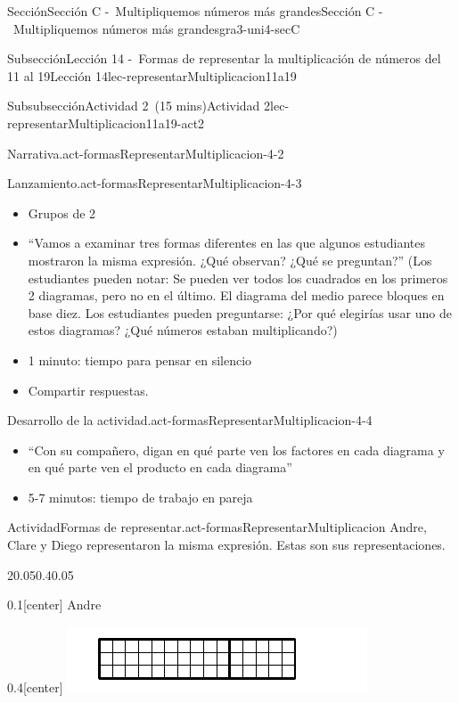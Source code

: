 \documentclass[oneside,10pt,]{article}
\begin{document}
\begin{sectionptx}{Sección}{Sección C -~Multipliquemos números más grandes}{}{Sección C -~Multipliquemos números más grandes}{}{}{gra3-uni4-secC}
\begin{subsectionptx}{Subsección}{Lección 14 -~Formas de representar la multiplicación de números del 11 al 19}{}{Lección 14}{}{}{lec-representarMultiplicacion11a19}
\begin{subsubsectionptx}{Subsubsección}{Actividad 2~(15 mins)}{}{Actividad 2}{}{}{lec-representarMultiplicacion11a19-act2}
\begin{paragraphs}{Narrativa.}{act-formasRepresentarMultiplicacion-4-2}
\end{paragraphs}%
\begin{paragraphs}{Lanzamiento.}{act-formasRepresentarMultiplicacion-4-3}%
%
\begin{itemize}[label=\textbullet]
\item{}Grupos de 2%
\item{}``Vamos a examinar tres formas diferentes en las que algunos estudiantes mostraron la misma expresión. ¿Qué observan? ¿Qué se preguntan?'' (Los estudiantes pueden notar: Se pueden ver todos los cuadrados en los primeros 2 diagramas, pero no en el último. El diagrama del medio parece bloques en base diez. Los estudiantes pueden preguntarse: ¿Por qué elegirías usar uno de estos diagramas? ¿Qué números estaban multiplicando?)%
\item{}1 minuto: tiempo para pensar en silencio%
\item{}Compartir respuestas.%
\end{itemize}
\end{paragraphs}%
\begin{paragraphs}{Desarrollo de la actividad.}{act-formasRepresentarMultiplicacion-4-4}%
%
\begin{itemize}[label=\textbullet]
\item{}``Con su compañero, digan en qué parte ven los factores en cada diagrama y en qué parte ven el producto en cada diagrama''%
\item{}5-7 minutos: tiempo de trabajo en pareja%
\end{itemize}
\end{paragraphs}%
\begin{activity}{Actividad}{Formas de representar.}{act-formasRepresentarMultiplicacion}%
Andre, Clare y Diego representaron la misma expresión. Estas son sus representaciones.%
\begin{sidebyside}{2}{0.05}{0.4}{0.05}%
\begin{sbspanel}{0.1}[center]%
Andre%
\end{sbspanel}%
\begin{sbspanel}{0.4}[center]%
\includegraphics[width=\linewidth]{external/svg-source/tikz-file-147551-scale13.pdf}
\end{sbspanel}%

\end{sidebyside}
\end{activity}
\end{subsubsectionptx}
\end{subsectionptx}
\end{sectionptx}
\end{document}
